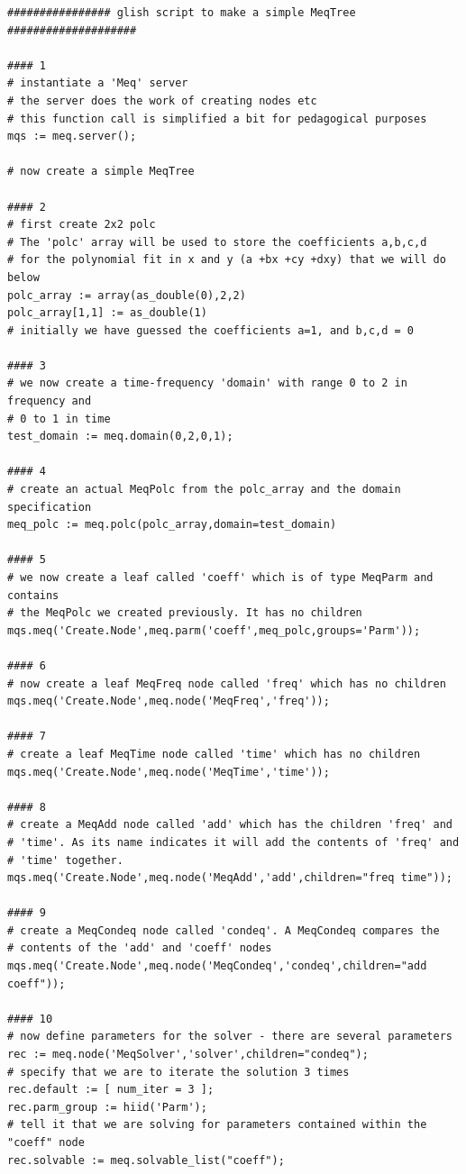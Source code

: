 \documentclass[10pt]{article}
\begin{document}
\begin{verbatim}
################ glish script to make a simple MeqTree ####################

#### 1
# instantiate a 'Meq' server
# the server does the work of creating nodes etc
# this function call is simplified a bit for pedagogical purposes
mqs := meq.server();

# now create a simple MeqTree

#### 2
# first create 2x2 polc
# The 'polc' array will be used to store the coefficients a,b,c,d
# for the polynomial fit in x and y (a +bx +cy +dxy) that we will do below
polc_array := array(as_double(0),2,2) 
polc_array[1,1] := as_double(1)
# initially we have guessed the coefficients a=1, and b,c,d = 0

#### 3
# we now create a time-frequency 'domain' with range 0 to 2 in frequency and
# 0 to 1 in time 
test_domain := meq.domain(0,2,0,1);

#### 4
# create an actual MeqPolc from the polc_array and the domain specification
meq_polc := meq.polc(polc_array,domain=test_domain)
                                                                                
#### 5
# we now create a leaf called 'coeff' which is of type MeqParm and contains
# the MeqPolc we created previously. It has no children
mqs.meq('Create.Node',meq.parm('coeff',meq_polc,groups='Parm'));

#### 6
# now create a leaf MeqFreq node called 'freq' which has no children
mqs.meq('Create.Node',meq.node('MeqFreq','freq'));

#### 7
# create a leaf MeqTime node called 'time' which has no children
mqs.meq('Create.Node',meq.node('MeqTime','time'));

#### 8
# create a MeqAdd node called 'add' which has the children 'freq' and
# 'time'. As its name indicates it will add the contents of 'freq' and
# 'time' together.
mqs.meq('Create.Node',meq.node('MeqAdd','add',children="freq time"));

#### 9
# create a MeqCondeq node called 'condeq'. A MeqCondeq compares the 
# contents of the 'add' and 'coeff' nodes 
mqs.meq('Create.Node',meq.node('MeqCondeq','condeq',children="add coeff"));

#### 10
# now define parameters for the solver - there are several parameters
rec := meq.node('MeqSolver','solver',children="condeq");
# specify that we are to iterate the solution 3 times
rec.default := [ num_iter = 3 ];
rec.parm_group := hiid('Parm');
# tell it that we are solving for parameters contained within the "coeff" node
rec.solvable := meq.solvable_list("coeff");


\end{verbatim}
\end{document}
